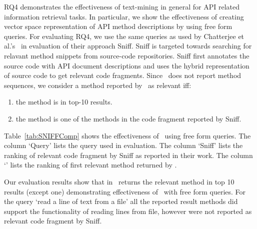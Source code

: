 RQ4 demonstrates the effectiveness of text-mining in general for API related information retrieval tasks.
In particular, we show the effectiveness of creating vector space representation of
API method descriptions by using free form queries.
For evaluating RQ4, we use the same queries as used by Chatterjee et al.'s~\cite{chatterjee2009sniff} in evaluation of their approach Sniff.
Sniff is targeted towards searching for relavant method snippets from source-code repositories. Sniff first annotates the source code with API document descriptions and uses the hybrid representation of source code to get relevant code fragments. 
Since \tool\ does not report method sequences, we consider a method reported by \tool\ as relevant iff:

\begin{enumerate}
	\item the method is in top-10 results.
	\item the method is one of the methods in the code fragment reported by Sniff.
\end{enumerate}

Table~\ref{tab:SNIFFComp} shows the effectiveness of \tool\ using free form queries.
The column `Query' lists the query used in evaluation.
The column `Sniff' lists the ranking of relevant code fragment by Sniff as reported in their work.
The column `\tool' lists the ranking of first relevant method returned by \tool.


Our evaluation results show that in \tool\ returns the relevant method in top 10 results (except one) demonstrating effectiveness of \tool\ with free form queries. For the query `read a line of text from a file' all the reported result methods did support the functionality of reading lines from file, however were not reported as relevant code fragment by Sniff.

